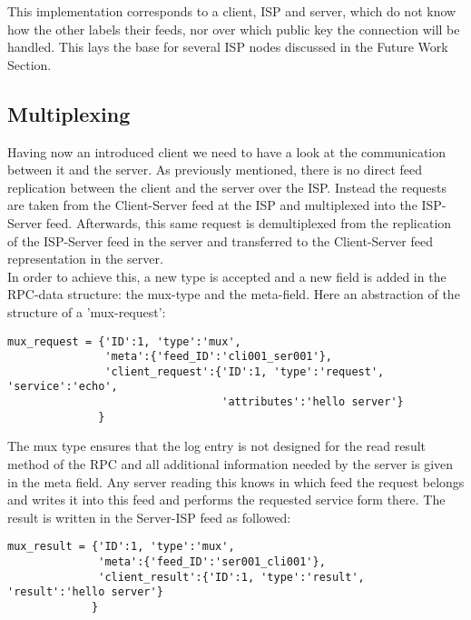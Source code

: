 This implementation corresponds to a client, ISP and server, which do not know how the other labels their feeds, nor over which public key the connection will be handled. This lays the base for several ISP nodes discussed in the Future Work Section. 


\subsection{Multiplexing}
Having now an introduced client we need to have a look at the communication between it and the server. As previously mentioned, there is no direct feed replication between the client and the server over the ISP. Instead the requests are taken from the Client-Server feed at the ISP and multiplexed into the ISP-Server feed. Afterwards, this same request is demultiplexed from the replication of the ISP-Server feed in the server and transferred to the Client-Server feed representation in the server.\\
In order to achieve this, a new type is accepted and a new field is added in the RPC-data structure: the mux-type and the meta-field. Here an abstraction of the structure of a ’mux-request’:\\
\begin{python}
    
\begin{lstlisting}
mux_request = {'ID':1, 'type':'mux', 
               'meta':{'feed_ID':'cli001_ser001'},
               'client_request':{'ID':1, 'type':'request', 'service':'echo', 
                                 'attributes':'hello server'}
              }
\end{lstlisting}
\end{python}

The mux type ensures that the log entry is not designed for the read result method of the RPC and all additional information needed by the server is given in the meta field. Any server reading this knows in which feed the request belongs and writes it into this feed and performs the requested service form there. The result is written in the Server-ISP feed as followed:\\
\begin{python}
    
\begin{lstlisting}
mux_result = {'ID':1, 'type':'mux', 
              'meta':{'feed_ID':'ser001_cli001'},
              'client_result':{'ID':1, 'type':'result', 'result':'hello server'}
             }
\end{lstlisting}
\end{python}

